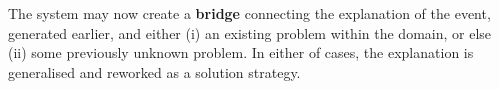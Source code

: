 


\begin{defn}\label{def:bridge}
\hypertarget{def:bridge}{}The system may now create a \textbf{bridge}
connecting the explanation of the event, generated earlier, and either
(i) an existing problem within the domain, or else (ii) some
previously unknown problem.  In either of cases, the explanation is
generalised and reworked as a solution strategy.
\end{defn}
                                         
